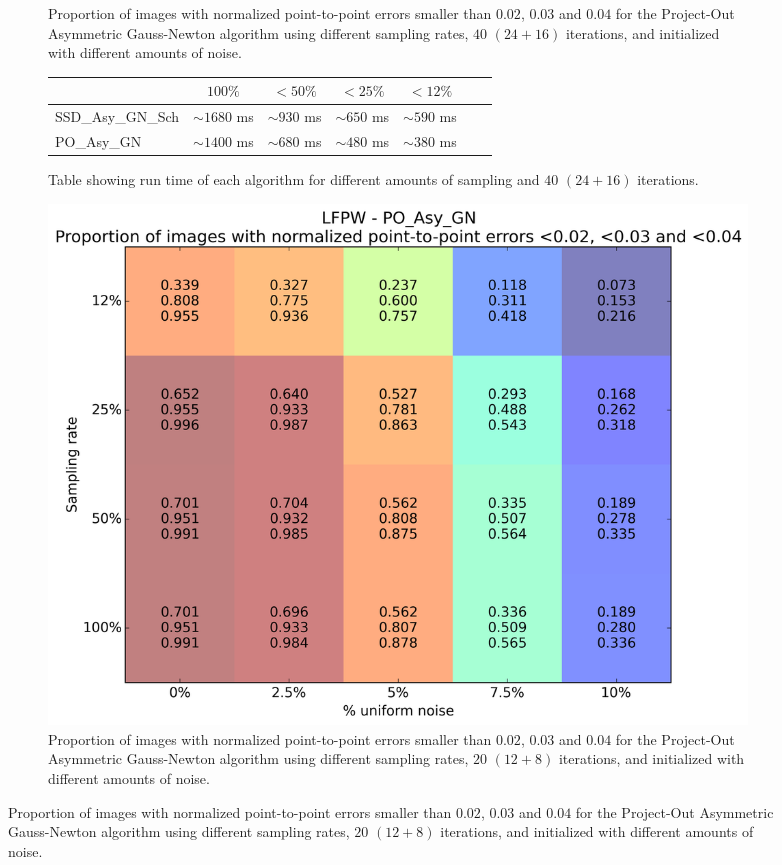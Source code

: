 \begin{figure}[p]
\begin{subfigure}{0.48\textwidth}
	    \caption{Proportion of images with normalized point-to-point errors smaller than $0.02$, $0.03$ and $0.04$ for the Project-Out Asymmetric Gauss-Newton algorithm using different sampling rates, $40$ $(24 + 16)$ iterations, and initialized with different amounts of noise.}
	    \label{fig:sampling_vs_noise_po_asy_gn}
	\end{subfigure}
	\par\bigskip\bigskip
	\begin{subfigure}{\textwidth}
		\center
		\begin{tabular}{lcccccc}
		    \toprule
		    & $100\%$ & $<50\%$ & $<25\%$ & $<12\%$ 
		    \\
		    \midrule
		    SSD\_Asy\_GN\_Sch & $\sim1680$ ms & $\sim930$ ms & $\sim650$ ms & $\sim590$ ms
		    \\ 
		    PO\_Asy\_GN & $\sim1400$ ms & $\sim680$ ms & $\sim480$ ms & $\sim380$ ms
		    \\
		    \bottomrule
	  	\end{tabular}
	  	\caption{Table showing run time of each algorithm for different amounts of sampling and $40$ $(24 + 16)$ iterations.}
	    \label{tab:runtime_40}
	\end{subfigure}
	\par\bigskip\bigskip
	\begin{subfigure}{0.48\textwidth}
	    \includegraphics[width=\textwidth]{experiments/sampling/sampling_vs_noise_po_asy_gn_20.png}
	    \caption{Proportion of images with normalized point-to-point errors smaller than $0.02$, $0.03$ and $0.04$ for the Project-Out Asymmetric Gauss-Newton algorithm using different sampling rates, $20$ $(12 + 8)$ iterations, and initialized with different amounts of noise.}

\end{subfigure}
\end{figure}
